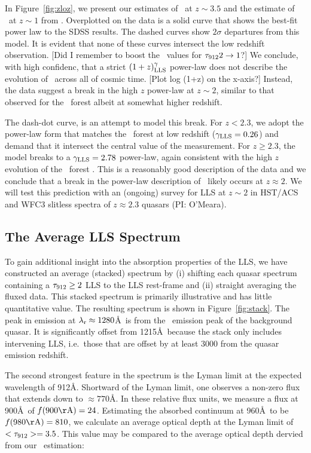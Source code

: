 \documentclass[12pt,preprint]{aastex}
\begin{document}
In Figure~\ref{fig:zloz}, we present our estimates of \lzlls\
at $z \sim 3.5$ and the estimate of \lzlls\ at $z \sim 1$
from \cite[][see Howk et al., in prep for a new estimate]{sl95}.
Overplotted on the data is a solid curve that shows the best-fit
power law to the SDSS results.  The dashed curves show $2\sigma$
departures from this model.  It is evident that none of these
curves intersect the low redshift observation.
[Did I remember to boost the \lzlls\ values for $\tau_{\rm 912} 2 \to 1$?]
We conclude, with high confidenc, that a strict $(1+z)^\gamma_{\rm LLS}$
power-law does not describe the evolution of \lzlls\ across
all of cosmic time.   [Plot log (1+z) on the x-axis?]
Instead, the data suggest a break in the high $z$ power-law
at $z \sim 2$, similar to that observed for the \lya\ forest
albeit at somewhat higher redshift.  

The dash-dot curve, is an attempt to model this break.  
For $z<2.3$, we adopt the power-law form that matches
the \lya\ forest at low redshift ($\gamma_{\rm LLS} = 0.26$) and
demand that it intersect the central value of the \cite{sl95}
measurement.  For $z\ge 2.3$, the model breaks to a $\gamma_{\rm LLS} = 2.78$
power-law, again consistent with the high $z$ evolution of the
\lya\ forest \citep[e.g.][]{kim02}.  This is a reasonably
good description of the data and we conclude that a break
in the power-law description of \lzlls\ likely occurs at $z \approx 2$.
We will test this prediction with an (ongoing) survey for LLS
at $z \sim 2$ in HST/ACS and WFC3 slitless spectra of 
$z \approx 2.3$ quasars (PI: O'Meara).

\subsection{The Average LLS Spectrum}

To gain additional insight into the absorption properties of the
LLS, we have constructed an average (stacked) spectrum 
by (i) shifting each quasar spectrum containing a $\tau_{\rm 912} \ge 2$ LLS
to the LLS rest-frame and (ii) straight averaging the fluxed data.
This stacked spectrum is primarily illustrative and has little 
quantitative value.  The resulting spectrum is shown in 
Figure~\ref{fig:stack}.  The peak in emission at 
$\lambda_{\rm r} \approx 1280$\AA\ is from the \lya\ emission
peak of the background quasar.  It is significantly
offset from 1215\AA\ because the stack only includes intervening
LLS, i.e.\ those that are offset by at least 3000 \kms from the 
quasar emission redshift.  

The second strongest feature in the
spectrum is the Lyman limit at the expected wavelength of 912\AA.
Shortward of the Lyman limit, one observes a non-zero flux that
extends down to $\approx 770$\AA.  In these relative
flux units, we measure a flux at 900\AA\ of $f({\rm 900 \AA}) = 24$.  
Estimating the absorbed continuum at 960\AA\ to be 
$f({\rm 980 \AA}) = 810$, we calculate an average optical depth
at the Lyman limit of $<\tau_{\rm 912}> = 3.5$.  This value may be compared
to the average optical depth dervied from our \fnhi\ estimation:
\end{document}
